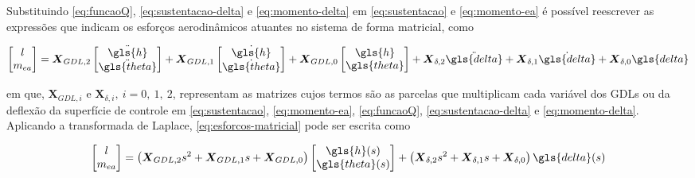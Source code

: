 Substituindo \eqref{eq:funcaoQ}, \eqref{eq:sustentacao-delta} e \eqref{eq:momento-delta} em \eqref{eq:sustentacao} e \eqref{eq:momento-ea} é possível reescrever as expressões que indicam os esforços aerodinâmicos atuantes no sistema de forma matricial, como

\begin{equation}\label{eq:esforcos-matricial}
    \begin{bmatrix}
        l \\ m_{ea}
    \end{bmatrix} = 
    \boldsymbol{X}_{GDL,2}
    \begin{bmatrix}
        \ddot{\gls{h}} \\ \ddot{\gls{theta}}
    \end{bmatrix} +
    \boldsymbol{X}_{GDL,1}
    \begin{bmatrix}
        \dot{\gls{h}} \\ \dot{\gls{theta}}
    \end{bmatrix} +
    \boldsymbol{X}_{GDL,0}
    \begin{bmatrix}
        \gls{h} \\ \gls{theta}
    \end{bmatrix} +
    \boldsymbol{X}_{\delta,2}\ddot{\gls{delta}} + \boldsymbol{X}_{\delta,1}\dot{\gls{delta}} + \boldsymbol{X}_{\delta,0}\gls{delta}
\end{equation}

\noindent em que, $\boldsymbol{X}_{GDL,i}$ e $\boldsymbol{X}_{\delta,i}, \ i = 0,\ 1,\ 2$, representam as matrizes cujos termos são as parcelas que multiplicam cada variável dos \gls{GDL}s ou da deflexão da superfície de controle em \eqref{eq:sustentacao}, \eqref{eq:momento-ea}, \eqref{eq:funcaoQ}, \eqref{eq:sustentacao-delta} e \eqref{eq:momento-delta}. Aplicando a transformada de Laplace, \eqref{eq:esforcos-matricial} pode ser escrita como

\begin{equation}\label{eq:esforcos-matricial2}
    \begin{bmatrix}
        l \\ m_{ea}
    \end{bmatrix} = \left(
    \boldsymbol{X}_{GDL,2}s^{2} + \boldsymbol{X}_{GDL,1}s + \boldsymbol{X}_{GDL,0} \right)
    \begin{bmatrix}
        \gls{h}(s) \\ \gls{theta}(s)
    \end{bmatrix} +
    \left( \boldsymbol{X}_{\delta,2}s^{2} + \boldsymbol{X}_{\delta,1}s + \boldsymbol{X}_{\delta,0} \right) \gls{delta}(s)
\end{equation}

